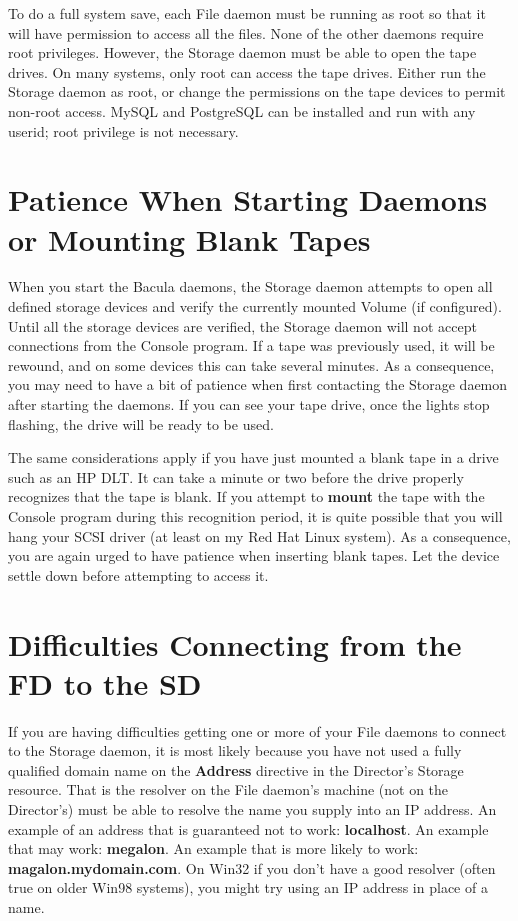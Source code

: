 To do a full system save, each File daemon must be running as root so that it
will have permission to access all the files. None of the other daemons
require root privileges. However, the Storage daemon must be able to open the
tape drives. On many systems, only root can access the tape drives. Either run
the Storage daemon as root, or change the permissions on the tape devices to
permit non-root access. MySQL and PostgreSQL can be installed and run with any
userid; root privilege is not necessary. 

\section{Patience When Starting Daemons or Mounting Blank Tapes}

When you start the Bacula daemons, the Storage daemon attempts to open all
defined storage devices and verify the currently mounted Volume (if
configured). Until all the storage devices are verified, the Storage daemon
will not accept connections from the Console program. If a tape was previously
used, it will be rewound, and on some devices this can take several minutes.
As a consequence, you may need to have a bit of patience when first contacting
the Storage daemon after starting the daemons. If you can see your tape drive,
once the lights stop flashing, the drive will be ready to be used. 

The same considerations apply if you have just mounted a blank tape in a drive
such as an HP DLT. It can take a minute or two before the drive properly
recognizes that the tape is blank. If you attempt to {\bf mount} the tape with
the Console program during this recognition period, it is quite possible that
you will hang your SCSI driver (at least on my Red Hat Linux system). As a
consequence, you are again urged to have patience when inserting blank tapes.
Let the device settle down before attempting to access it. 

\section{Difficulties Connecting from the FD to the SD}

If you are having difficulties getting one or more of your File daemons to
connect to the Storage daemon, it is most likely because you have not used a
fully qualified domain name on the {\bf Address} directive in the
Director's Storage resource. That is the resolver on the File daemon's machine
(not on the Director's) must be able to resolve the name you supply into an IP
address. An example of an address that is guaranteed not to work: {\bf
localhost}. An example that may work: {\bf megalon}. An example that is more
likely to work: {\bf magalon.mydomain.com}. On Win32 if you don't have a good
resolver (often true on older Win98 systems), you might try using an IP
address in place of a name. 

